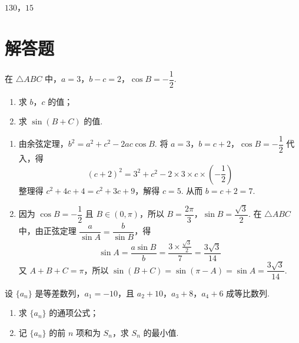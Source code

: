 \begin{answer}
\(130\)，\(15\)
\end{answer}

\section{解答题}

\begin{problem}
在 \(\triangle ABC\) 中，\(a=3\)，\(b-c=2\)，\(\cos B=-\dfrac12\).

\begin{enumerate}
\item 求 \(b\)，\(c\) 的值；

\item 求 \(\sin(B+C)\) 的值.
\end{enumerate}
\end{problem}

\begin{solution}
\begin{enumerate}
\item 由余弦定理，\(b^2=a^2+c^2-2ac\cos B\). 将 \(a=3\)，\(b=c+2\)，\(\cos B=-\dfrac12\) 代入，得
\[
(c+2)^2=3^2+c^2-2\times3\times c\times\left(-\frac12\right)
\]
整理得 \(c^2+4c+4=c^2+3c+9\)，解得 \(c=5\). 从而 \(b=c+2=7\).

\item 因为 \(\cos B=-\dfrac12\) 且 \(B\in(0,\pi)\)，所以 \(B=\dfrac{2\pi}{3}\)，\(\sin B=\dfrac{\sqrt3}{2}\).
在 \(\triangle ABC\) 中，由正弦定理 \(\dfrac{a}{\sin A}=\dfrac{b}{\sin B}\)，得
\[
\sin A=\frac{a\sin B}{b}=\frac{3\times\frac{\sqrt3}{2}}{7}=\frac{3\sqrt3}{14}
\]
又 \(A+B+C=\pi\)，所以 \(\sin(B+C)=\sin(\pi-A)=\sin A=\dfrac{3\sqrt3}{14}\).
\end{enumerate}
\end{solution}

\begin{problem}
设 \(\{a_n\}\) 是等差数列，\(a_1=-10\)，且 \(a_2+10\)，\(a_3+8\)，\(a_4+6\) 成等比数列.

\begin{enumerate}
\item 求 \(\{a_n\}\) 的通项公式；

\item 记 \(\{a_n\}\) 的前 \(n\) 项和为 \(S_n\)，求 \(S_n\) 的最小值.
\end{enumerate}
\end{problem}

